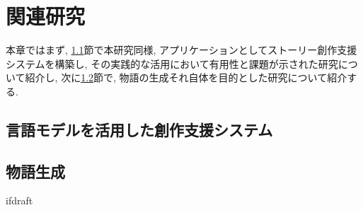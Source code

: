 \documentclass[a4j,12pt]{jsreport}
\begin{document}
\pagestyle{fancy}
\lhead{\rightmark}
\renewcommand{\chaptermark}[1]{\markboth{第\ \thechapter\ 章\ #1}{}}
\fi

\chapter{関連研究}\label{chap:relatedworks}
本章ではまず, \ref{sec:language_model}節で本研究同様, アプリケーションとしてストーリー創作支援システムを構築し, その実践的な活用において有用性と課題が示された研究について紹介し, 次に\ref{sec:story_generation}節で, 物語の生成それ自体を目的とした研究について紹介する.

\section{言語モデルを活用した創作支援システム}\label{sec:language_model}


\section{物語生成}\label{sec:story_generation}


\expandafter\ifx\csname ifdraft\endcsname\relax
   \fancyhead[LO]{}
   \printbibliography[title=参考文献]
   
\end{document}
